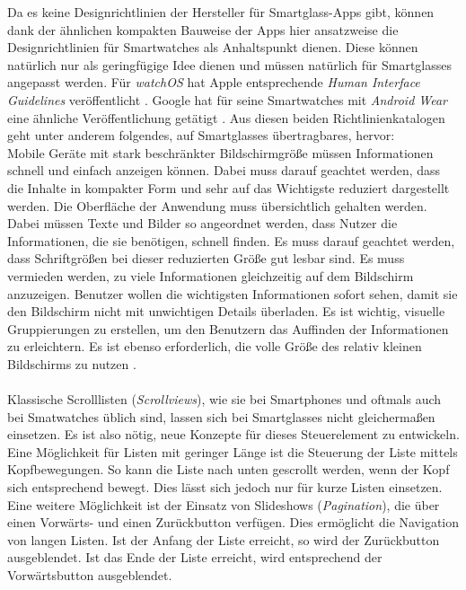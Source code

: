 Da es keine Designrichtlinien der Hersteller für Smartglass-Apps gibt, können dank der ähnlichen kompakten Bauweise der Apps hier ansatzweise die Designrichtlinien für Smartwatches als Anhaltspunkt dienen. Diese können natürlich nur als geringfügige Idee dienen und müssen natürlich für Smartglasses angepasst werden.
Für \emph{watchOS} hat Apple entsprechende \emph{Human Interface Guidelines} veröffentlicht \cite{Apple2018c}. Google hat für seine Smartwatches mit \emph{Android Wear} eine ähnliche Veröffentlichung getätigt \cite{Google2018}. Aus diesen beiden Richtlinienkatalogen geht unter anderem folgendes, auf Smartglasses übertragbares, hervor:
\\
Mobile Geräte mit stark beschränkter Bildschirmgröße  müssen Informationen schnell und einfach anzeigen können. Dabei muss darauf geachtet werden, dass die Inhalte in kompakter Form und sehr auf das Wichtigste reduziert dargestellt werden. Die Oberfläche der Anwendung muss übersichtlich gehalten werden. Dabei müssen Texte und Bilder so angeordnet werden, dass Nutzer die Informationen, die sie benötigen, schnell finden. Es muss darauf geachtet werden, dass Schriftgrößen bei dieser reduzierten Größe gut lesbar sind. Es muss vermieden werden, zu viele Informationen gleichzeitig auf dem Bildschirm anzuzeigen. Benutzer wollen die wichtigsten Informationen sofort sehen, damit sie den Bildschirm nicht mit unwichtigen Details überladen. Es ist wichtig, visuelle Gruppierungen zu erstellen, um den Benutzern das Auffinden der Informationen zu erleichtern. Es ist ebenso erforderlich, die volle Größe des relativ kleinen Bildschirms zu nutzen \cite{Apple2018c, Google2018}.
\\
\\
Klassische Scrolllisten (\emph{Scrollviews}), wie sie bei Smartphones und oftmals auch bei Smatwatches üblich sind, lassen sich bei Smartglasses nicht gleichermaßen einsetzen. Es ist also nötig, neue Konzepte für dieses Steuerelement zu entwickeln. Eine Möglichkeit für Listen mit geringer Länge ist die Steuerung der Liste mittels Kopfbewegungen. So kann die Liste nach unten gescrollt werden, wenn der Kopf sich entsprechend bewegt. Dies lässt sich jedoch nur für kurze Listen einsetzen. Eine weitere Möglichkeit ist der Einsatz von Slideshows (\emph{Pagination}), die über einen Vorwärts- und einen Zurückbutton verfügen. Dies ermöglicht die Navigation von langen Listen. Ist der Anfang der Liste erreicht, so wird der Zurückbutton ausgeblendet. Ist das Ende der Liste erreicht, wird entsprechend der Vorwärtsbutton ausgeblendet.
%
%
%
%
%
%
